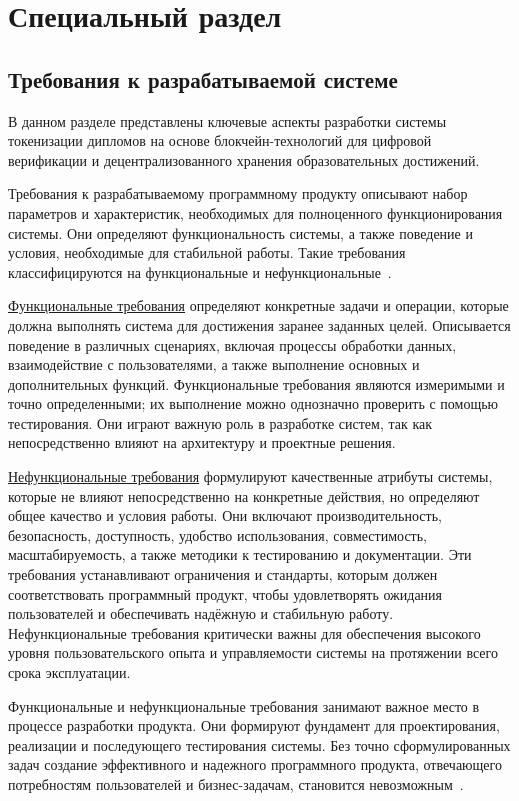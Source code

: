 \section{Специальный раздел}
\label{sec:special}

\subsection{Требования к разрабатываемой системе}

В данном разделе представлены ключевые аспекты разработки системы токенизации дипломов на основе блокчейн-технологий для цифровой верификации и децентрализованного хранения образовательных достижений. 

Требования к разрабатываемому программному продукту описывают набор параметров и характеристик, необходимых для полноценного функционирования системы. Они определяют функциональность системы, а также поведение и условия, необходимые для стабильной работы. Такие требования классифицируются на функциональные и нефункциональные~\cite{bib:func_and_nf_req}.

\hyperref[subsec:func_req]{Функциональные требования} определяют конкретные задачи и операции, которые должна выполнять система для достижения заранее заданных целей. Описывается поведение в различных сценариях, включая процессы обработки данных, взаимодействие с пользователями, а также выполнение основных и дополнительных функций. Функциональные требования являются измеримыми и точно определенными; их выполнение можно однозначно проверить с помощью тестирования. Они играют важную роль в разработке систем, так как непосредственно влияют на архитектуру и проектные решения.

\hyperref[subsec:nonfunc_req]{Нефункциональные требования} формулируют качественные атрибуты системы, которые не влияют непосредственно на конкретные действия, но определяют общее качество и условия работы. Они включают производительность, безопасность, доступность, удобство использования, совместимость, масштабируемость, а также методики к тестированию и документации. Эти требования устанавливают ограничения и стандарты, которым должен соответствовать программный продукт, чтобы удовлетворять ожидания пользователей и обеспечивать надёжную и стабильную работу. Нефункциональные требования критически важны для обеспечения высокого уровня пользовательского опыта и управляемости системы на протяжении всего срока эксплуатации.

Функциональные и нефункциональные требования занимают важное место в процессе разработки продукта. Они формируют фундамент для проектирования, реализации и последующего тестирования системы. Без точно сформулированных задач создание эффективного и надежного программного продукта, отвечающего  потребностям пользователей и бизнес-задачам, становится невозможным~\cite{bib:app_req}.

